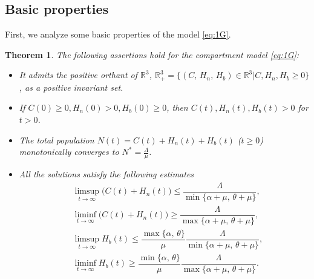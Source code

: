 \documentclass[11pt]{article}
\newtheorem{theorem}{Theorem}[section]
\theoremstyle{definition}
\theoremstyle{remark}
\numberwithin{equation}{section}
\begin{document}
\subsection{Basic properties}\label{Subsec2}
First, we analyze some basic properties of the model \eqref{eq:1G}.
\begin{theorem}\label{Theorem1}
The following assertions hold for the compartment model \eqref{eq:1G}:
\begin{itemize}
\item[(i)] It admits the positive orthant of $\mathbb{R}^3$, 
$\mathbb{R}_+^3 = \{(C,\,H_n,\,H_b) \in \mathbb{R}^3|C, H_n, H_b \ge0\}$,
as a positive invariant set. 
\item[(ii)] If $C(0)\ge0, H_n(0) > 0, H_b(0) \ge0$, then $C(t), H_n(t), H_b(t)>0$ for $t>0$.
\item[(iii)] The total population $N(t) = C(t) + H_n(t) + H_b(t)$ ($t \ge0$) monotonically converges to $N^* = \frac{\Lambda}{\mu}$.
\item[(iv)] All the solutions satisfy the following estimates
\begin{equation}\label{eq:9}
\begin{split}
&\limsup_{t \to \infty}\big(C(t) + H_n(t)\big) \le \dfrac{\Lambda}{\min\{\alpha + \mu,\,\theta + \mu\}},\\
&\liminf_{t \to \infty}\big(C(t) + H_n(t)\big) \ge \dfrac{\Lambda}{\max\{\alpha + \mu,\,\theta + \mu\}},\\
&\limsup_{t \to \infty}H_b(t) \le \dfrac{{\max\{\alpha,\,\theta\}}}{\mu}\dfrac{\Lambda}{\min\{\alpha + \mu,\,\theta + \mu\}},\\
&\liminf_{t \to \infty}H_b(t) \ge \dfrac{{\min\{\alpha,\,\theta\}}}{\mu}\dfrac{\Lambda}{\max\{\alpha + \mu,\,\theta + \mu\}}.
\end{split}
\end{equation}
\end{itemize}
\end{theorem}
\end{document}
